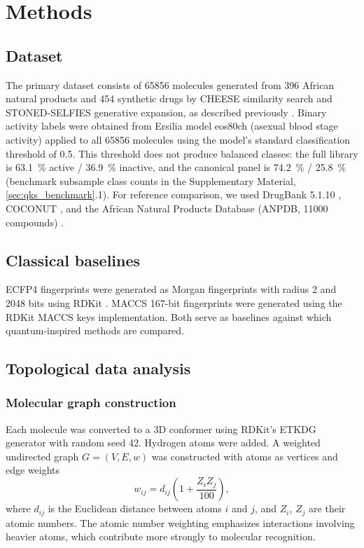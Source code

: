 \documentclass[11pt,a4paper]{article}
\begin{document}
\section{Methods}

\subsection{Dataset}

The primary dataset consists of \num{65856} molecules generated from \num{396} African natural products and \num{454} synthetic drugs by CHEESE similarity search \citep{lzicar_cheese_2024} and STONED-SELFIES generative expansion, as described previously \citep{temgoua2026antimalarial}. Binary activity labels were obtained from Ersilia model eos80ch (asexual blood stage activity) applied to all \num{65856} molecules using the model's standard classification threshold of \num{0.5}. This threshold does not produce balanced classes: the full library is \qty{63.1}{\percent} active / \qty{36.9}{\percent} inactive, and the canonical panel is \qty{74.2}{\percent} / \qty{25.8}{\percent} (benchmark subsample class counts in the Supplementary Material, \cref{sec:qks_benchmark}.1). For reference comparison, we used DrugBank 5.1.10 \citep{drugbank_2018}, COCONUT \citep{coconut_2021}, and the African Natural Products Database (ANPDB, \num{11000} compounds) \citep{anpdb_2026}.

\subsection{Classical baselines}

ECFP4 fingerprints were generated as Morgan fingerprints with radius 2 and \num{2048} bits using RDKit \citep{rdkit_2024}. MACCS \num{167}-bit fingerprints were generated using the RDKit MACCS keys implementation. Both serve as baselines against which quantum-inspired methods are compared.

\subsection{Topological data analysis}

\subsubsection{Molecular graph construction}

Each molecule was converted to a 3D conformer using RDKit's ETKDG generator with random seed \num{42}. Hydrogen atoms were added. A weighted undirected graph $G = (V, E, w)$ was constructed with atoms as vertices and edge weights
\begin{equation}
w_{ij} = d_{ij}\left(1 + \frac{Z_i Z_j}{100}\right),
\end{equation}
where $d_{ij}$ is the Euclidean distance between atoms $i$ and $j$, and $Z_i$, $Z_j$ are their atomic numbers. The atomic number weighting emphasizes interactions involving heavier atoms, which contribute more strongly to molecular recognition.
\end{document}
